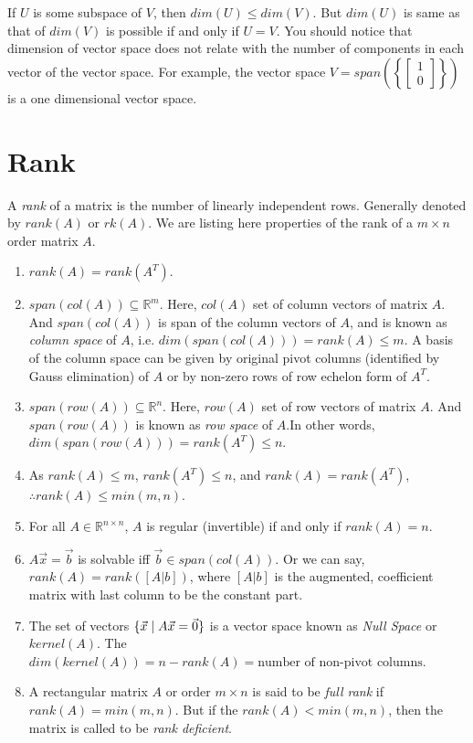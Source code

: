 \documentclass{article}
\newcommand{\suchthat}{\;\ifnum\currentgrouptype=16 \middle\fi|\;}%
\begin{document}
If $U$ is some subspace of $V$, then $dim(U)\leq dim(V)$. But $dim(U)$ is same as that of $dim(V)$ is possible if and only if $U=V$. You should notice that dimension of vector space does not relate with the number of components in each vector of the vector space. For example, the vector space $V = span \left (\left \{\begin{bmatrix} 1\\0 \end{bmatrix} \right\} \right )$ is a one dimensional vector space.

\section{Rank}
A \textit{rank} of a matrix is the number of linearly independent rows. Generally denoted by $rank(A)$ or $rk(A)$. We are listing here properties of the rank of a $m\times n$ order matrix $A$.
\begin{enumerate}
    \item \(rank(A)=rank(A^T)\).
    \item \(span(col(A))\subseteq\mathbb{R}^m\). Here, $col(A)$ set of column vectors of matrix $A$. And $span(col(A))$ is span of the column vectors of $A$, and is known as \textit{column space} of $A$, i.e. $dim(span(col(A)))=rank(A)\leq m$. A basis of the column space can be given by original pivot columns (identified by Gauss elimination) of $A$ or by non-zero rows of row echelon form of $A^T$.
    \item \(span(row(A))\subseteq\mathbb{R}^n\). Here, $row(A)$ set of row vectors of matrix $A$. And $span(row(A))$ is known as \textit{row space} of $A$.In other words, $dim(span(row(A)))=rank(A^T)\leq n$.
    \item As $rank(A)\leq m$, $rank(A^T)\leq n$, and \(rank(A)=rank(A^T)\), \(\therefore rank(A)\leq min(m,n)\).
    \item For all $A\in\mathbb{R}^{n\times n}$, $A$ is regular (invertible) if and only if $rank(A)=n$.
    \item $A\vec{x}=\vec{b}$ is solvable iff $\vec{b}\in span(col(A))$. Or we can say, $rank(A)=rank([A|b])$, where $[A|b]$ is the augmented, coefficient matrix with last column to be the constant part.
    \item The set of vectors \(\{\vec{x}\suchthat A\vec{x}=\vec{0}\}\) is a vector space known as \textit{Null Space} or $kernel(A)$. The $dim(kernel(A))=n-rank(A)=\text{number of non-pivot columns.}$
    \item A rectangular matrix $A$ or order $m\times n$ is said to be \textit{full rank} if $rank(A)=min(m,n)$. But if the $rank(A)<min(m,n)$, then the matrix is called to be \textit{rank deficient}.
\end{enumerate}
\end{document}

